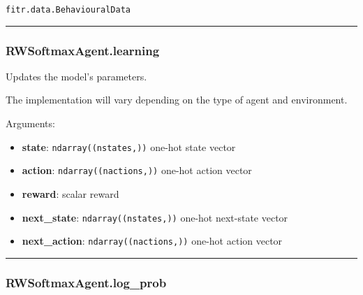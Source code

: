 \texttt{fitr.data.BehaviouralData}

\begin{center}\rule{0.5\linewidth}{\linethickness}\end{center}

\subsubsection{RWSoftmaxAgent.learning}\label{rwsoftmaxagent.learning}

\begin{Shaded}
\begin{Highlighting}[]
\end{Highlighting}
\end{Shaded}

Updates the model's parameters.

The implementation will vary depending on the type of agent and
environment.

Arguments:

\begin{itemize}
\tightlist
\item
  \textbf{state}: \texttt{ndarray((nstates,))} one-hot state vector
\item
  \textbf{action}: \texttt{ndarray((nactions,))} one-hot action vector
\item
  \textbf{reward}: scalar reward
\item
  \textbf{next\_state}: \texttt{ndarray((nstates,))} one-hot next-state
  vector
\item
  \textbf{next\_action}: \texttt{ndarray((nactions,))} one-hot action
  vector
\end{itemize}

\begin{center}\rule{0.5\linewidth}{\linethickness}\end{center}

\subsubsection{RWSoftmaxAgent.log\_prob}\label{rwsoftmaxagent.log_prob}

\begin{Shaded}
\begin{Highlighting}[]
\end{Highlighting}
\end{Shaded}

